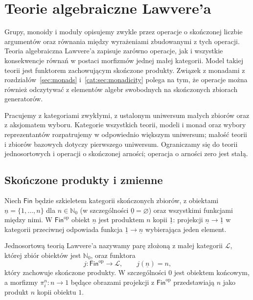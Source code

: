 \section{Teorie algebraiczne Lawvere'a}\label{cat:sec:lawvere-theories}

Grupy, monoidy i moduły opisujemy zwykle przez operacje o skończonej liczbie argumentów oraz równania między wyrażeniami zbudowanymi z tych operacji. Teoria algebraiczna Lawvere'a zapisuje zarówno operacje, jak i wszystkie konsekwencje równań w postaci morfizmów jednej małej kategorii. Model takiej teorii jest funktorem zachowującym skończone produkty. Związek z monadami z rozdziałów~\ref{sec:monads} i~\ref{cat:sec:monadicity} polega na tym, że operacje można również odczytywać z elementów algebr swobodnych na skończonych zbiorach generatorów.

Pracujemy z kategoriami zwykłymi, z ustalonym uniwersum małych zbiorów oraz z aksjomatem wyboru. Kategorie wszystkich teorii, modeli i monad oraz wybory reprezentantów rozpatrujemy w odpowiednio większym uniwersum; małość teorii i zbiorów bazowych dotyczy pierwszego uniwersum. Ograniczamy się do teorii jednosortowych i operacji o skończonej arności; operacja o arności zero jest stałą.

\subsection{Skończone produkty i zmienne}

Niech $\mathsf{Fin}$ będzie szkieletem kategorii skończonych zbiorów, z obiektami $\underline n=\{1,\ldots,n\}$ dla $n\in\mathbb N_0$ (w szczególności $\underline 0=\varnothing$) oraz wszystkimi funkcjami między nimi. W $\mathsf{Fin}^{\mathrm{op}}$ obiekt $\underline n$ jest produktem $n$ kopii $\underline 1$: projekcji $\underline n\to\underline 1$ w kategorii przeciwnej odpowiada funkcja $\underline 1\to\underline n$ wybierająca jeden element.

\begin{definicja}\label{cat:def:lawvere-theory}
Jednosortową teorią Lawvere'a nazywamy parę złożoną z małej kategorii $\mathcal L$, której zbiór obiektów jest $\mathbb N_0$, oraz funktora
\[
 j:\mathsf{Fin}^{\mathrm{op}}\longrightarrow\mathcal L,
 \qquad j(\underline n)=n,
\]
który zachowuje skończone produkty. W szczególności $0$ jest obiektem końcowym, a morfizmy $\pi_i^n:n\to1$ będące obrazami projekcji z $\mathsf{Fin}^{\mathrm{op}}$ przedstawiają $n$ jako produkt $n$ kopii obiektu $1$.
\end{definicja}

